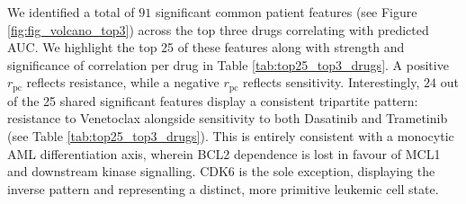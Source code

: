 \documentclass[sigconf,authordraft]{acmart}
\begin{document}
We identified a total of $91$ significant common patient features (see Figure \ref{fig:fig_volcano_top3}) across the top three drugs correlating with predicted AUC. We highlight the top 25 of these features along with strength and significance of correlation per drug in Table \ref{tab:top25_top3_drugs}. A positive $r_{\text{pc}}$ reflects resistance, while a negative $r_{\text{pc}}$ reflects sensitivity. Interestingly, $24$ out of the 25 shared significant features display a consistent tripartite pattern: resistance to Venetoclax alongside sensitivity to both Dasatinib and Trametinib (see Table \ref{tab:top25_top3_drugs}). This is entirely consistent with a monocytic AML differentiation axis, wherein BCL2 dependence is lost in favour of MCL1 and downstream kinase signalling. CDK6 is the sole exception, displaying the inverse pattern and representing a distinct, more primitive leukemic cell state.
\end{document}
